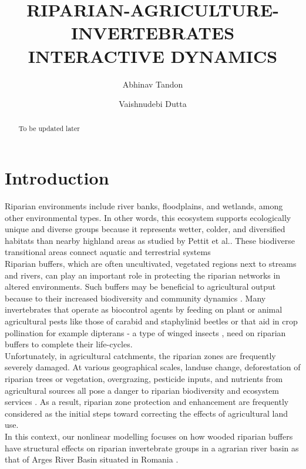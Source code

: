 \documentclass[12pt]{article}
\date{}
\author[1]{Abhinav Tandon}
\author[2]{Vaishnudebi Dutta}
\affil[1]{Corresponding Author\thanks{abhinav.abhi02@gmail.com}}
\affil[1,2]{Birla Institute of Technology Mesra, Ranchi - 835215, Jharkhand, INDIA}
\title{RIPARIAN-AGRICULTURE-INVERTEBRATES INTERACTIVE DYNAMICS}
\date{}
\numberwithin{equation}{section}
\begin{document}
\maketitle
\vspace{-1cm}
\begin{abstract}
To be updated later
\end{abstract}
\section{Introduction}
Riparian environments include river banks, floodplains, and wetlands, among other environmental types. In other words, this ecosystem supports ecologically unique and diverse groups because it represents wetter, colder, and diversified habitats than nearby highland areas as studied by Pettit et al.\cite{pettit2007fire}. These biodiverse transitional areas connect aquatic and terrestrial systems \cite{popescu2021riparian} \\ 
Riparian buffers, which are often uncultivated, vegetated regions next to streams and rivers, can play an important role in protecting the riparian networks in altered environments\cite{burdon2020assessing}. Such buffers may be beneficial to agricultural output because to their increased biodiversity and community dynamics \cite{forio2020small}. Many invertebrates that operate as biocontrol agents by feeding on plant or animal agricultural pests like those of carabid and staphylinid beetles \cite{andersen2000long} or that aid in crop pollination for example dipterans - a type of winged insects \cite{ssymank2008pollinating}, need on riparian buffers to complete their life-cycles.\\
Unfortunately, in agricultural catchments, the riparian zones are frequently severely damaged. At various geographical scales, landuse change, deforestation of riparian trees or vegetation, overgrazing, pesticide inputs, and nutrients from agricultural sources all pose a danger to riparian biodiversity and ecosystem services \cite{burdon2013habitat}. As a result, riparian zone protection and enhancement are frequently considered as the initial steps toward correcting the effects of agricultural land use.\\
In this context, our nonlinear modelling focuses on how wooded riparian buffers have structural effects on riparian invertebrate groups in a agrarian river basin as that of Arges River Basin situated in Romania \cite{popescu2021riparian}.\\
\vspace{-1cm}
\end{document}
